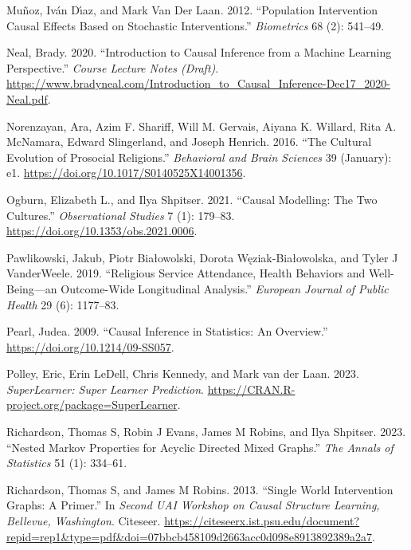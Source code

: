 \documentclass[
  single column]{article}
\newlength{\cslhangindent}
\newenvironment{CSLReferences}[2] %
 {\begin{list}{}{%
  \setlength{\itemindent}{0pt}
  \setlength{\leftmargin}{0pt}
  \setlength{\parsep}{0pt}
  \ifodd #1
   \setlength{\leftmargin}{\cslhangindent}
   \setlength{\itemindent}{-1\cslhangindent}
  \fi
  \setlength{\itemsep}{#2\baselineskip}}}
 {\end{list}}
\begin{document}
\begin{CSLReferences}{1}{0}
Muñoz, Iván Dı́az, and Mark Van Der Laan. 2012. {``Population
Intervention Causal Effects Based on Stochastic Interventions.''}
\emph{Biometrics} 68 (2): 541--49.

Neal, Brady. 2020. {``Introduction to Causal Inference from a Machine
Learning Perspective.''} \emph{Course Lecture Notes (Draft)}.
\url{https://www.bradyneal.com/Introduction_to_Causal_Inference-Dec17_2020-Neal.pdf}.

Norenzayan, Ara, Azim F. Shariff, Will M. Gervais, Aiyana K. Willard,
Rita A. McNamara, Edward Slingerland, and Joseph Henrich. 2016. {``The
Cultural Evolution of Prosocial Religions.''} \emph{Behavioral and Brain
Sciences} 39 (January): e1.
\url{https://doi.org/10.1017/S0140525X14001356}.

Ogburn, Elizabeth L., and Ilya Shpitser. 2021. {``Causal Modelling: The
Two Cultures.''} \emph{Observational Studies} 7 (1): 179--83.
\url{https://doi.org/10.1353/obs.2021.0006}.

Pawlikowski, Jakub, Piotr Białowolski, Dorota Węziak-Białowolska, and
Tyler J VanderWeele. 2019. {``Religious Service Attendance, Health
Behaviors and Well-Being---an Outcome-Wide Longitudinal Analysis.''}
\emph{European Journal of Public Health} 29 (6): 1177--83.

Pearl, Judea. 2009. {``Causal Inference in Statistics: An Overview.''}
\url{https://doi.org/10.1214/09-SS057}.

Polley, Eric, Erin LeDell, Chris Kennedy, and Mark van der Laan. 2023.
\emph{SuperLearner: Super Learner Prediction}.
\url{https://CRAN.R-project.org/package=SuperLearner}.

Richardson, Thomas S, Robin J Evans, James M Robins, and Ilya Shpitser.
2023. {``Nested {M}arkov Properties for Acyclic Directed Mixed
Graphs.''} \emph{The Annals of Statistics} 51 (1): 334--61.

Richardson, Thomas S, and James M Robins. 2013. {``Single World
Intervention Graphs: A Primer.''} In \emph{Second UAI Workshop on Causal
Structure Learning, {B}ellevue, {W}ashington}. Citeseer.
\url{https://citeseerx.ist.psu.edu/document?repid=rep1&type=pdf&doi=07bbcb458109d2663acc0d098e8913892389a2a7}.


\end{CSLReferences}
\end{document}
